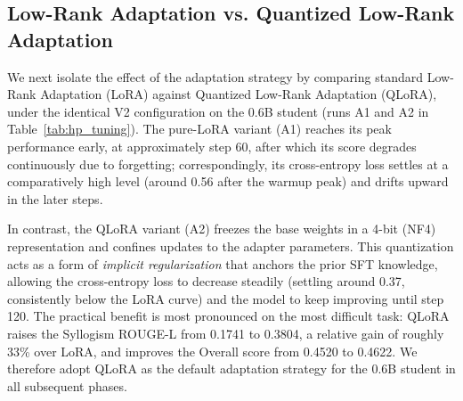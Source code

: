 \begin{table}[htbp]
\centering
\caption{Impact of Hyperparameter Tuning (V1 vs. V2) on the 325-sample Split-Test}
\label{tab:hp_tuning}
\end{table}

\subsection{Low-Rank Adaptation vs. Quantized Low-Rank Adaptation}

We next isolate the effect of the adaptation strategy by comparing standard Low-Rank Adaptation (LoRA) \parencite{hu2021loralowrankadaptationlarge} against Quantized Low-Rank Adaptation (QLoRA), under the identical V2 configuration on the 0.6B student (runs A1 and A2 in Table~\ref{tab:hp_tuning}). The pure-LoRA variant (A1) reaches its peak performance early, at approximately step 60, after which its score degrades continuously due to forgetting; correspondingly, its cross-entropy loss settles at a comparatively high level (around 0.56 after the warmup peak) and drifts upward in the later steps.

In contrast, the QLoRA variant (A2) freezes the base weights in a 4-bit (NF4) representation \parencite{dettmers2022llmint88bitmatrixmultiplication} and confines updates to the adapter parameters. This quantization acts as a form of \textit{implicit regularization} that anchors the prior SFT knowledge, allowing the cross-entropy loss to decrease steadily (settling around 0.37, consistently below the LoRA curve) and the model to keep improving until step 120. The practical benefit is most pronounced on the most difficult task: QLoRA raises the Syllogism ROUGE-L from 0.1741 to 0.3804, a relative gain of roughly 33\% over LoRA, and improves the Overall score from 0.4520 to 0.4622. We therefore adopt QLoRA as the default adaptation strategy for the 0.6B student in all subsequent phases.

